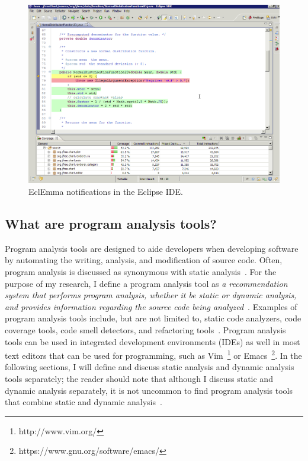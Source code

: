 \documentclass{llncs}
\begin{document}
\begin{figure} [ht]
	\centering
	\includegraphics[width=\textwidth]{figs/eclemma.png}
	\caption{EclEmma notifications in the Eclipse IDE.}
	\label{fig:ecl}
\end{figure}

\subsection{What are program analysis tools?}
Program analysis tools are designed to aide developers when developing software by automating the writing, analysis, and modification of source code.
Often, program analysis is discussed as synonymous with static analysis~\cite{nielson2015principles}. 
For the purpose of my research, I define a program analysis tool as \emph{a recommendation system that performs program analysis, whether it be static or dynamic analysis, and provides information regarding the source code being analyzed}~\cite{robillard2014recommendation}.
Examples of program analysis tools include, but are not limited to, static code analyzers, code coverage tools, code smell detectors, and refactoring tools~\cite{adolph2011using,Murphy-Hill:2010:Ambient,ge2012reconciling}.
Program analysis tools can be used in integrated development environments (IDEs) as well in most text editors that can be used for programming, such as Vim~\footnote{http://www.vim.org/} or Emacs~\footnote{https://www.gnu.org/software/emacs/}. 
In the following sections, I will define and discuss static analysis and dynamic analysis tools separately; the reader should note that although I discuss static and dynamic analysis separately, it is not uncommon to find program analysis tools that combine static and dynamic analysis~\cite{ernst2003static}.                                                
\end{document}
